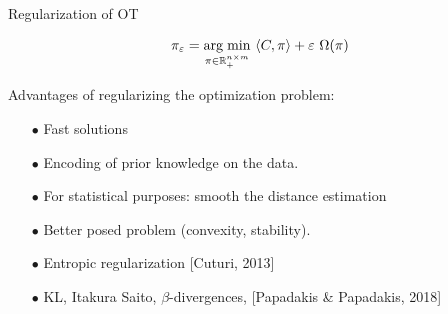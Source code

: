 \documentclass[pdf,aspectratio=169,10pt]{beamer}
\begin{document}
\begin{frame}{Regularization of OT}
\begin{block}{}
$$\pi_{\varepsilon} = \argmin_{\pi\in\R^{n\times m}_+} \ \langle C,\pi\rangle + \varepsilon\ \Omega(\pi)$$
\end{block}

\vspace{0.2cm}Advantages of regularizing the optimization problem:
\begin{itemize}
\item[$\bullet$] Fast solutions
\item[$\bullet$] Encoding of prior knowledge on the data.
\item[$\bullet$] For statistical purposes: smooth the distance estimation
\item[$\bullet$] Better posed problem (convexity, stability).
\end{itemize}

\begin{itemize}
\item[$\bullet$] Entropic regularization [Cuturi, 2013]
\item[$\bullet$] KL, Itakura Saito, $\beta$-divergences, [Papadakis \& Papadakis, 2018]
\end{itemize}

\end{frame}
\end{document}
